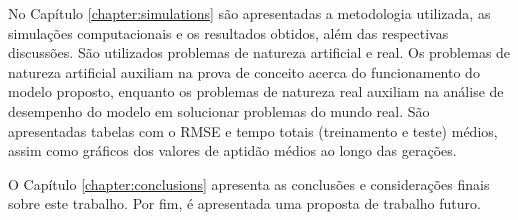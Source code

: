 No Capítulo \ref{chapter:simulations} são apresentadas a metodologia utilizada, as simulações computacionais e os resultados obtidos, além das respectivas discussões. São utilizados problemas de natureza artificial e real. Os problemas de natureza artificial auxiliam na prova de conceito acerca do funcionamento do modelo proposto, enquanto os problemas de natureza real auxiliam na análise de desempenho do modelo em solucionar problemas do mundo real. São apresentadas tabelas com o RMSE e tempo totais (treinamento e teste) médios, assim como gráficos dos valores de aptidão médios ao longo das gerações.

O Capítulo \ref{chapter:conclusions} apresenta as conclusões e considerações finais sobre este trabalho. Por fim, é apresentada uma proposta de trabalho futuro.